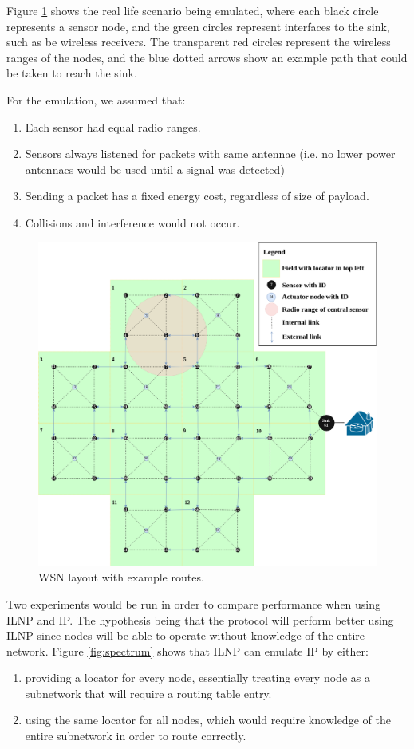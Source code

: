 \documentclass[12pt]{article}
\begin{document}
Figure \ref{fig:layout} shows the real life scenario being emulated, where each black circle represents a sensor node, and the green circles represent interfaces to the sink, such as be wireless receivers. The transparent red circles represent the wireless ranges of the nodes, and the blue dotted arrows show  an example path that could be taken to reach the sink.

For the emulation, we assumed that: 
\begin{enumerate}
    \item Each sensor had equal radio ranges.
    \item Sensors always listened for packets with same antennae (i.e. no lower power antennaes would be used until a signal was detected\cite{offon})
    \item Sending a packet has a fixed energy cost, regardless of size of payload.
    \item Collisions and interference would not occur.
\end{enumerate}

\begin{figure}[!ht]
	\centering
	\includegraphics[width=\linewidth]{images/layout}
	\caption{WSN layout with example routes.}
	\label{fig:layout}
\end{figure}

Two experiments would be run in order to compare performance when using ILNP and IP. The hypothesis being that the protocol will perform better using ILNP since nodes will be able to operate without knowledge of the entire network. Figure \ref{fig:spectrum} shows that ILNP can emulate IP by either:
\begin{enumerate}
	\item providing a locator for every node, essentially treating every node as a subnetwork that will require a routing table entry.
	\item using the same locator for all nodes, which would require knowledge of the entire subnetwork in order to route correctly.
\end{enumerate}
\end{document}
